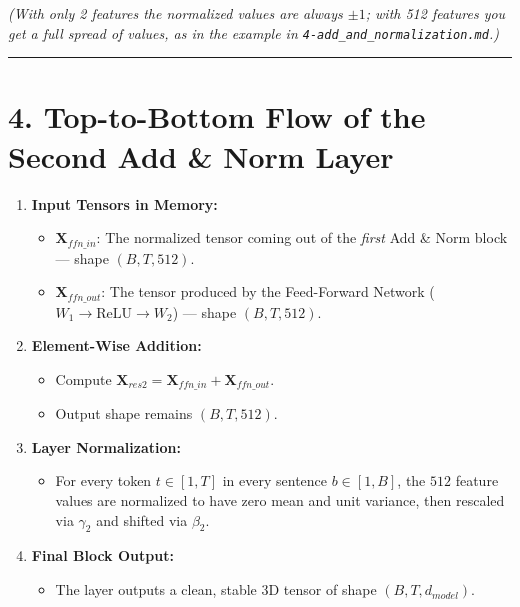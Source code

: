 \documentclass[11pt,a4paper,oneside]{report}
\providecommand{\tightlist}{\setlength{\itemsep}{0pt}\setlength{\parskip}{0pt}}
\begin{document}
\emph{(With only 2 features the normalized values are always \(\pm 1\); with 512 features you get a full spread of values, as in the example in \texttt{4-add\_\allowbreak{}and\_\allowbreak{}normalization.\allowbreak{}md}.)}

\begin{center}\rule{0.5\linewidth}{0.5pt}\end{center}

\section{4. Top-to-Bottom Flow of the Second Add \& Norm Layer}\label{4-top-to-bottom-flow-of-the-second-add--norm-layer}

\begin{enumerate}
\def\labelenumi{\arabic{enumi}.}
\item
  \textbf{Input Tensors in Memory:}

  \begin{itemize}
  \tightlist
  \item
    \(\mathbf{X}_{ffn\_in}\): The normalized tensor coming out of the \emph{first} Add \& Norm block --- shape \((B, T, 512)\).
  \item
    \(\mathbf{X}_{ffn\_out}\): The tensor produced by the Feed-Forward Network (\(W_1 \rightarrow \text{ReLU} \rightarrow W_2\)) --- shape \((B, T, 512)\).
  \end{itemize}
\item
  \textbf{Element-Wise Addition:}

  \begin{itemize}
  \tightlist
  \item
    Compute \(\mathbf{X}_{res2} = \mathbf{X}_{ffn\_in} + \mathbf{X}_{ffn\_out}\).
  \item
    Output shape remains \textbf{\((B, T, 512)\)}.
  \end{itemize}
\item
  \textbf{Layer Normalization:}

  \begin{itemize}
  \tightlist
  \item
    For every token \(t \in [1, T]\) in every sentence \(b \in [1, B]\), the \(512\) feature values are normalized to have zero mean and unit variance, then rescaled via \(\gamma_2\) and shifted via \(\beta_2\).
  \end{itemize}
\item
  \textbf{Final Block Output:}

  \begin{itemize}
  \tightlist
  \item
    The layer outputs a clean, stable 3D tensor of shape \textbf{\((B, T, d_{model})\)}.
  \end{itemize}
\end{enumerate}
\end{document}
